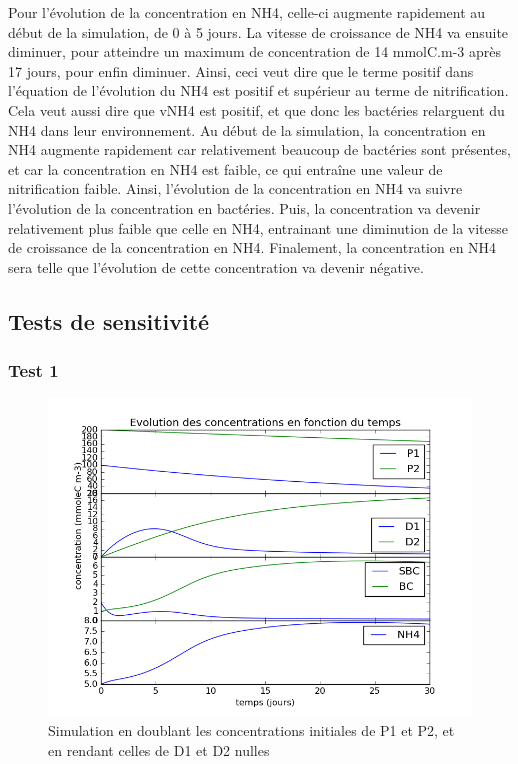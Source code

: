 \par{
Pour l'\'evolution de la concentration en NH4, celle-ci augmente rapidement au d\'ebut de la simulation, de 0 \`a 5 jours. La vitesse de croissance de NH4 va ensuite diminuer, pour atteindre un maximum de concentration de 14 mmolC.m-3 apr\`es 17 jours, pour enfin diminuer. Ainsi, ceci veut dire que le terme positif dans l'\'equation de l'\'evolution du NH4 est positif et sup\'erieur au terme de nitrification. Cela veut aussi dire que vNH4 est positif, et que donc les bact\'eries relarguent du NH4 dans leur environnement. Au d\'ebut de la simulation, la concentration en NH4 augmente rapidement car relativement beaucoup de bact\'eries sont pr\'esentes, et car la concentration en NH4 est faible, ce qui entra\^ine une valeur de nitrification faible. Ainsi, l'\'evolution de la concentration en NH4 va suivre l'\'evolution de la concentration en bact\'eries. Puis, la concentration va devenir relativement plus faible que celle en NH4, entrainant une diminution de la vitesse de croissance de la concentration en NH4. Finalement, la concentration en NH4 sera telle que l'\'evolution de cette concentration va devenir n\'egative.
}

\subsection{Tests de sensitivit\'e}
\subsubsection{Test 1}

\begin{figure}[h!]
  \includegraphics[width=\textwidth]{partie2/Test1.png}
  \caption{Simulation en doublant les concentrations initiales de P1 et P2, et en rendant celles de D1 et D2 nulles
  }
  \label{fig:partie2test1}
\end{figure}

